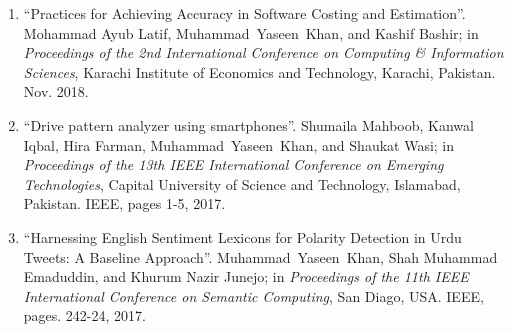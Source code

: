 \documentclass[a4paper, 10pt]{article}
\begin{document}
\begin{enumerate}
 
  
  \item ``Practices for Achieving Accuracy in Software Costing and Estimation''. Mohammad Ayub Latif, \textcolor{NavyBlue}{Muhammad~Yaseen~Khan}, and Kashif Bashir; in \emph{Proceedings of the 2nd International Conference on Computing \& Information Sciences}, Karachi Institute of Economics and Technology, Karachi, Pakistan. Nov. 2018.
  
  \item ``Drive pattern analyzer using smartphones''. Shumaila Mahboob, Kanwal Iqbal, Hira Farman, \textcolor{NavyBlue}{Muhammad~Yaseen~Khan}, and Shaukat Wasi; in \emph{ Proceedings of the 13th IEEE International Conference on Emerging Technologies}, Capital University of Science and Technology, Islamabad, Pakistan. IEEE, pages 1-5, 2017.
  
  \item ``Harnessing English Sentiment Lexicons for Polarity Detection in Urdu Tweets: A Baseline Approach''. \textcolor{NavyBlue}{Muhammad~Yaseen~Khan}, Shah Muhammad Emaduddin, and Khurum Nazir Junejo;  in \emph{Proceedings of the 11th IEEE International Conference on Semantic Computing}, San Diago, USA. IEEE, pages. 242-24, 2017.
\end{enumerate}
\end{document}
